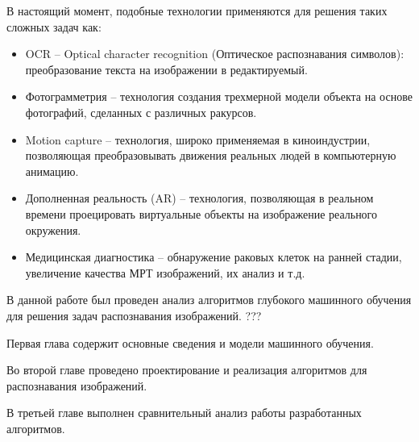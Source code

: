 В настоящий момент, подобные технологии применяются для решения таких сложных задач как:
\begin{itemize}
    \item OCR – Optical character recognition (Оптическое распознавания символов): преобразование текста на изображении в редактируемый.
    \item Фотограмметрия – технология создания трехмерной модели объекта на основе фотографий, сделанных с различных ракурсов.
    \item Motion capture – технология, широко применяемая в киноиндустрии, позволяющая преобразовывать движения реальных людей в компьютерную анимацию.
    \item Дополненная реальность (AR) – технология, позволяющая в реальном времени проецировать виртуальные объекты на изображение реального окружения. 
    \item Медицинская диагностика – обнаружение раковых клеток на ранней стадии, увеличение качества МРТ изображений, их анализ и т.д.
\end{itemize}

В данной работе был проведен анализ алгоритмов глубокого машинного обучения для решения задач распознавания изображений. ???

Первая глава содержит основные сведения и модели машинного обучения.

Во второй главе проведено проектирование и реализация алгоритмов для распознавания изображений.

В третьей главе выполнен сравнительный анализ работы разработанных алгоритмов.

\clearpage